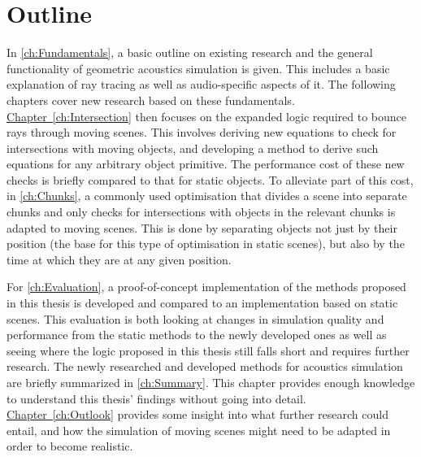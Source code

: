 \section{Outline}

In \autoref{ch:Fundamentals}, a basic outline on existing research and the general functionality of geometric acoustics simulation is given.
This includes a basic explanation of ray tracing as well as audio-specific aspects of it.
The following chapters cover new research based on these fundamentals.
\newline
\hyperref[ch:Intersection]{Chapter~\ref*{ch:Intersection}} then focuses on the expanded logic required to bounce rays through moving scenes.
This involves deriving new equations to check for intersections with moving objects,
and developing a method to derive such equations for any arbitrary object primitive.
The performance cost of these new checks is briefly compared to that for static objects.
\newline
To alleviate part of this cost, in \autoref{ch:Chunks},
a commonly used optimisation that divides a scene into separate chunks
and only checks for intersections with objects in the relevant chunks is adapted to moving scenes.
This is done by separating objects not just by their position (the base for this type of optimisation in static scenes),
but also by the time at which they are at any given position.
\iffalse
    \newline
    irs ch5
\fi
\newline
For \autoref{ch:Evaluation}, a proof-of-concept implementation of the methods proposed in this thesis is developed
and compared to an implementation based on static scenes.
This evaluation is both looking at changes in simulation quality and performance from the static methods to the newly developed ones
as well as seeing where the logic proposed in this thesis still falls short and requires further research.
\newline
The newly researched and developed methods for acoustics simulation are briefly summarized in \autoref{ch:Summary}.
This chapter provides enough knowledge to understand this thesis' findings without going into detail.
\newline
\hyperref[ch:Outlook]{Chapter~\ref*{ch:Outlook}} provides some insight into what further research could entail,
and how the simulation of moving scenes might need to be adapted in order to become realistic.

